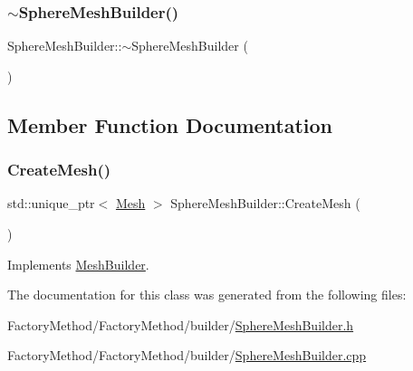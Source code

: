 \mbox{\label{class_sphere_mesh_builder_a17bbfd3306548933c1d2d4a5ec226f75}} 
\subsubsection{\texorpdfstring{$\sim$SphereMeshBuilder()}{~SphereMeshBuilder()}}
{\footnotesize\ttfamily Sphere\+Mesh\+Builder\+::$\sim$\+Sphere\+Mesh\+Builder (\begin{DoxyParamCaption}{ }\end{DoxyParamCaption})}



\subsection{Member Function Documentation}
\mbox{\label{class_sphere_mesh_builder_a17080b8851c3c5395e82536c44c0e7ec}} 
\subsubsection{\texorpdfstring{CreateMesh()}{CreateMesh()}}
{\footnotesize\ttfamily std\+::unique\+\_\+ptr$<$ \mbox{\hyperlink{class_mesh}{Mesh}} $>$ Sphere\+Mesh\+Builder\+::\+Create\+Mesh (\begin{DoxyParamCaption}{ }\end{DoxyParamCaption})\hspace{0.3cm}{\ttfamily [virtual]}}



Implements \mbox{\hyperlink{class_mesh_builder_a41cfd23b93c25bc016c889c2c67a2637}{Mesh\+Builder}}.



The documentation for this class was generated from the following files\+:\begin{DoxyCompactItemize}
\item 
Factory\+Method/\+Factory\+Method/builder/\mbox{\hyperlink{_sphere_mesh_builder_8h}{Sphere\+Mesh\+Builder.\+h}}\item 
Factory\+Method/\+Factory\+Method/builder/\mbox{\hyperlink{_sphere_mesh_builder_8cpp}{Sphere\+Mesh\+Builder.\+cpp}}\end{DoxyCompactItemize}
